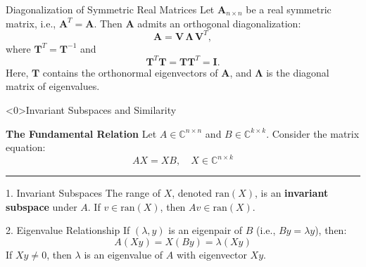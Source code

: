 \begin{frame}[t, fragile]{Diagonalization of Symmetric Real Matrices}
    Let $\mathbf{A}_{n\times n}$ be a real symmetric matrix, i.e., $\mathbf{A}^T = \mathbf{A}$.
    Then $\mathbf{A}$ admits an orthogonal diagonalization:
    \[
        \mathbf{A} = \mathbf{V}\,\mathbf{\Lambda}\,\mathbf{V}^{T},
    \]
    where $\mathbf{T}^{T} = \mathbf{T}^{-1}$ and
    \[
        \mathbf{T}^{T}\mathbf{T} = \mathbf{T}\mathbf{T}^{T} = \mathbf{I}.
    \]
    Here, $\mathbf{T}$ contains the orthonormal eigenvectors of $\mathbf{A}$, and
    $\mathbf{\Lambda}$ is the diagonal matrix of eigenvalues.

\end{frame}


\begin{frame}<0>{Invariant Subspaces and Similarity}

    \textbf{The Fundamental Relation}
    \vspace{0.2cm}
    Let $A \in \mathbb{C}^{n \times n}$ and $B \in \mathbb{C}^{k \times k}$. Consider the matrix equation:
    \[ AX = XB, \quad X \in \mathbb{C}^{n \times k} \]

    \hrule
    \vspace{0.4cm}

    \begin{block}{1. Invariant Subspaces}
        The range of $X$, denoted $\text{ran}(X)$, is an \textbf{invariant subspace} under $A$.
        If $v \in \text{ran}(X)$, then $Av \in \text{ran}(X)$.
    \end{block}

    \begin{block}{2. Eigenvalue Relationship}
        If $(\lambda, y)$ is an eigenpair of $B$ (i.e., $By = \lambda y$), then:
        \[ A(Xy) = X(By) = \lambda(Xy) \]
        If $Xy \neq 0$, then $\lambda$ is an eigenvalue of $A$ with eigenvector $Xy$.
    \end{block}

\end{frame}



